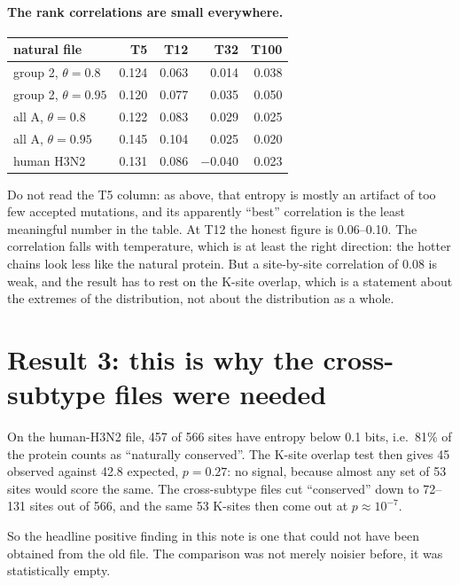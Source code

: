 \documentclass[11pt,a4paper]{article}
\begin{document}
\paragraph{The rank correlations are small everywhere.}
\begin{center}
\begin{tabular}{@{}lrrrr@{}}
\toprule
natural file & T5 & T12 & T32 & T100 \\
\midrule
group 2, $\theta = 0.8$  & 0.124 & 0.063 & 0.014 & 0.038 \\
group 2, $\theta = 0.95$ & 0.120 & 0.077 & 0.035 & 0.050 \\
all A, $\theta = 0.8$    & 0.122 & 0.083 & 0.029 & 0.025 \\
all A, $\theta = 0.95$   & 0.145 & 0.104 & 0.025 & 0.020 \\
human H3N2               & 0.131 & 0.086 & $-0.040$ & 0.023 \\
\bottomrule
\end{tabular}
\end{center}

\noindent
Do not read the T5 column: as above, that entropy is mostly an artifact of too
few accepted mutations, and its apparently ``best'' correlation is the least
meaningful number in the table. At T12 the honest figure is 0.06--0.10. The
correlation falls with temperature, which is at least the right direction: the
hotter chains look less like the natural protein. But a site-by-site
correlation of 0.08 is weak, and the result has to rest on the K-site overlap,
which is a statement about the extremes of the distribution, not about the
distribution as a whole.

\section{Result 3: this is why the cross-subtype files were needed}
\label{sec:power}

On the human-H3N2 file, 457 of 566 sites have entropy below 0.1 bits, i.e.\ 81\%
of the protein counts as ``naturally conserved''. The K-site overlap test then
gives 45 observed against 42.8 expected, $p = 0.27$: no signal, because almost
any set of 53 sites would score the same. The cross-subtype files cut
``conserved'' down to 72--131 sites out of 566, and the same 53 K-sites then
come out at $p \approx 10^{-7}$.

So the headline positive finding in this note is one that could not have been
obtained from the old file. The comparison was not merely noisier before, it was
statistically empty.
\end{document}
